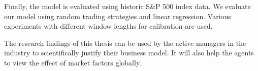 Finally, the model is evaluated using historic S\&P 500 index data. We evaluate our model using random trading strategies and linear regression. Various experiments with different window lengths for calibration are used.  

The research findings of this thesis can be used by the active managers in the industry to scientifically justify their business model. It will also help the agents to view the effect of market factors globally.